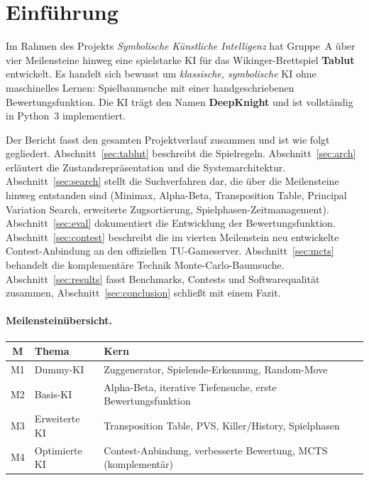 \documentclass[11pt,a4paper]{article}
\begin{document}
\tableofcontents
\newpage

\section{Einf\"uhrung}
Im Rahmen des Projekts \emph{Symbolische K\"unstliche Intelligenz} hat Gruppe~A
\"uber vier Meilensteine hinweg eine spielstarke KI f\"ur das Wikinger-Brettspiel
\textbf{Tablut} entwickelt.
Es handelt sich bewusst um \emph{klassische, symbolische} KI ohne maschinelles
Lernen: Spielbaumsuche mit einer handgeschriebenen Bewertungsfunktion.
Die KI tr\"agt den Namen \textbf{DeepKnight} und ist vollst\"andig in Python~3
implementiert.

Der Bericht fasst den gesamten Projektverlauf zusammen und ist wie folgt
gegliedert.
Abschnitt~\ref{sec:tablut} beschreibt die Spielregeln.
Abschnitt~\ref{sec:arch} erl\"autert die Zustandsrepr\"asentation und die
Systemarchitektur.
Abschnitt~\ref{sec:search} stellt die Suchverfahren dar, die \"uber die
Meilensteine hinweg entstanden sind (Minimax, Alpha-Beta, Transposition Table,
Principal Variation Search, erweiterte Zugsortierung, Spielphasen-Zeitmanagement).
Abschnitt~\ref{sec:eval} dokumentiert die Entwicklung der Bewertungsfunktion.
Abschnitt~\ref{sec:contest} beschreibt die im vierten Meilenstein neu
entwickelte Contest-Anbindung an den offiziellen TU-Gameserver.
Abschnitt~\ref{sec:mcts} behandelt die komplement\"are Technik
Monte-Carlo-Baumsuche.
Abschnitt~\ref{sec:results} fasst Benchmarks, Contests und Softwarequalit\"at
zusammen, Abschnitt~\ref{sec:conclusion} schlie\ss t mit einem Fazit.

\paragraph{Meilenstein\"ubersicht.}
\begin{center}
\begin{tabular}{clp{7.6cm}}
\toprule
\textbf{M} & \textbf{Thema} & \textbf{Kern} \\
\midrule
M1 & Dummy-KI      & Zuggenerator, Spielende-Erkennung, Random-Move \\
M2 & Basis-KI      & Alpha-Beta, iterative Tiefensuche, erste Bewertungsfunktion \\
M3 & Erweiterte KI & Transposition Table, PVS, Killer/History, Spielphasen \\
M4 & Optimierte KI & Contest-Anbindung, verbesserte Bewertung, MCTS (komplement\"ar) \\
\bottomrule
\end{tabular}
\end{center}
\end{document}
